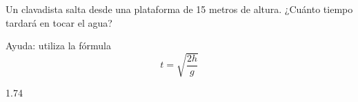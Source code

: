 
\question Un clavadista salta desde una plataforma de
          15 metros de altura. ¿Cuánto tiempo tardará en tocar el agua?

          Ayuda: utiliza la fórmula
          \begin{displaymath}
            t = \sqrt{\frac{2h}{g}}
          \end{displaymath}
          \begin{solution}[2cm]
            1.74
          \end{solution}
